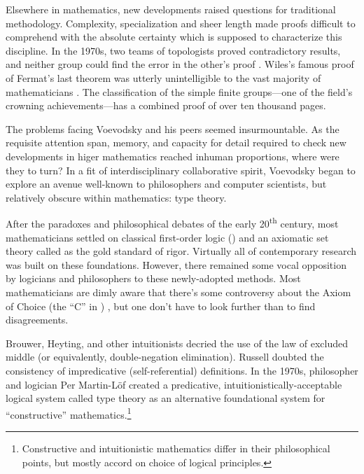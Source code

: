 \documentclass[./thesis.tex]{subfiles}
\begin{document}
Elsewhere in mathematics, new developments raised questions for traditional
methodology. Complexity, specialization and sheer length made
proofs difficult to comprehend with the absolute certainty which is
supposed to characterize this discipline. In the 1970s, two teams of
topologists proved contradictory results, and neither group could find the error
in the other's proof \cite{kolata}. Wiles's famous proof of Fermat's last
theorem was utterly unintelligible to the vast majority of mathematicians
\cite{nyt}. The classification of the simple finite groups---one of the field's
crowning achievements---has a combined proof of over ten thousand pages.

The problems facing Voevodsky and his peers seemed insurmountable.
As the requisite attention span, memory, and capacity for detail required to
check new developments in higer mathematics reached inhuman proportions,
where were they to turn? In a fit of interdisciplinary collaborative spirit,
Voevodsky began to explore an avenue well-known to philosophers and computer
scientists, but relatively obscure within mathematics: type theory.

After the paradoxes and philosophical debates of the early
20\textsuperscript{th} century, most mathematicians settled on classical
first-order logic (\FOL{}) and an axiomatic set theory called \ZFC{} as the gold
standard of rigor. Virtually all of contemporary research was built on these
foundations. However, there remained some vocal opposition by logicians and
philosophers to these newly-adopted methods. Most mathematicians are dimly aware
that there's some controversy about the Axiom of Choice (the ``C'' in
\ZFC{}) \cite{martin-lof-100-years}, but one don't have to look further
than \FOL{} to find disagreements.

Brouwer, Heyting, and other intuitionists decried the use of the law
of excluded middle (or equivalently, double-negation elimination). Russell
doubted the consistency of impredicative (self-referential) definitions.
In the 1970s, philosopher and logician Per Martin-Löf created a predicative,
intuitionistically-acceptable logical system called type theory as an
alternative foundational system for ``constructive''
mathematics.\footnote{Constructive and intuitionistic mathematics differ in
their philosophical points, but mostly accord on choice of logical principles.}
\end{document}
